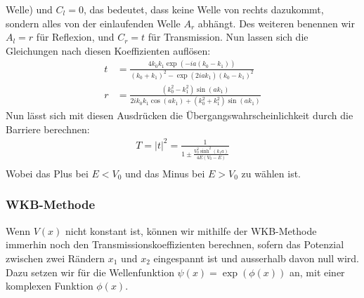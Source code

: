 Welle) und $C_l = 0$, das bedeutet, dass keine Welle von rechts dazukommt,
sondern alles von der einlaufenden Welle $A_r$ abhängt. Des weiteren
benennen wir $A_l=r$ für Reflexion, und $C_r=t$ für Transmission. Nun
lassen sich die Gleichungen nach diesen Koeffizienten auflösen:
\begin{align}
    t &= \frac{4k_0k_1\exp(-ia(k_0-k_1))}{(k_0+k_1)^2 - \exp(2iak_1)(k_0-k_1)^2}\\
    r &= \frac{(k_0^2 - k_1^2)\sin(ak_1)}{2ik_0k_1\cos(ak_1)+(k_0^2+k_1^2)\sin(ak_1)}
\end{align}
Nun lässt sich mit diesen Ausdrücken die Übergangswahrscheinlichkeit durch die 
Barriere berechnen:
\begin{align}
    T = \left | t \right |^2 = \frac{1}{1 \pm \frac{V_0^2 \sinh^2(k_1a)}{4E(V_0-E)}}\\
\end{align}
Wobei das Plus bei $E<V_0$ und das Minus bei $E>V_0$ zu wählen ist.


\subsubsection{WKB-Methode}
Wenn $V(x)$ nicht konstant ist, können wir mithilfe der WKB-Methode 
\cite{froman1970transmission}
immerhin noch den Transmissionskoeffizienten berechnen, sofern
das Potenzial zwischen zwei Rändern $x_1$ und $x_2$ eingespannt ist 
und ausserhalb davon null wird. Dazu setzen wir für die 
Wellenfunktion $\psi(x)=\exp(\phi(x))$ an, 
mit einer komplexen Funktion $\phi(x)$. 

